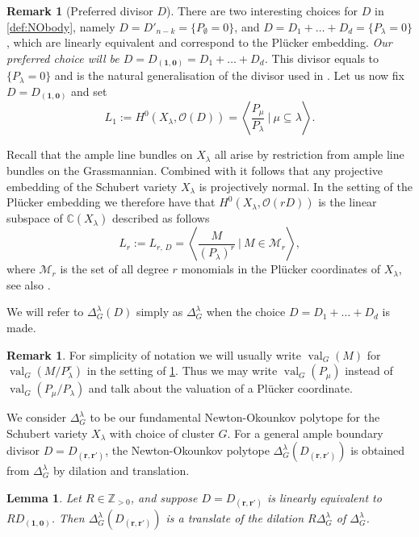 \documentclass{amsart}
\newtheorem{lemma}[thm]{Lemma}
\theoremstyle{definition}
\newtheorem{rem}[thm]{Remark}
\newtheorem{remark}[thm]{Remark}
\numberwithin{equation}{section}
\newcommand{\NO}{\Delta}
\newcommand{\C}{\mathbb{C}}
\newcommand{\Z}{\mathbb{Z}}
\newcommand{\val}{{\operatorname{val}}}
\begin{document}
\begin{rem}[Preferred divisor $D$]\label{rem:special}
There are two interesting choices for $D$ in \cref{def:NObody}, namely $D=D'_{n-k}= \{P_{\emptyset}=0\}$, and  
	$D=D_1+\dotsc +D_{d}= \{P_{\lambda}=0\}$, which are linearly equivalent and correspond to the Pl\"ucker embedding. 
	\emph{Our preferred
	choice will be $D=D_{(\mathbf{1,0})}=D_1+\dotsc +D_{d}$.} This divisor equals to $\{P_\lambda=0\}$ and is the natural generalisation of the divisor used in \cite{RW}. Let us now fix $D=D_{(\mathbf{1,0})}$ and set
	\[
L_1 :=H^0(X_{\lambda}, \mathcal{O}(D)) = \left < \frac{P_{\mu}}{P_{\lambda}} \ \vert \ \mu \subseteq \lambda \right >.
\]

Recall that the ample line bundles on $X_\lambda$ all arise by restriction from ample line bundles on the Grassmannian. Combined with \cite[Theorem 3]{RamananRamanathan} it follows that any projective embedding of the Schubert variety $X_\lambda$ is projectively normal.
	In 
	the setting of the Pl\"ucker embedding we therefore have that
 $H^0(X_{\lambda},\mathcal O(rD))$ 
is the linear subspace of $\C(X_{\lambda})$ described as follows
\begin{equation}\label{e:projnormal}
L_r:=L_{r,\, D}=\left<\frac{M}
{(P_{\lambda})^r} \ \vert \
M\in\mathcal{M}_{r}%
\right>,
\end{equation}
where $\mathcal{M}_r$ is the set of all degree $r$ monomials in the
	Pl\"ucker coordinates of $X_{\lambda}$,
	see also \cite{Lakshmibai}. 
	
We will refer to $\NO^{\lambda}_G(D)$ simply as $\NO^{\lambda}_G$ when  the choice $D=D_1+\dotsc + D_d$ is made.
\end{rem}


\begin{remark}
For simplicity of notation we will usually write $\val_G(M)$ 
for $\val_G(M/P_\lambda^r)$ in the setting of \cref{rem:special}. Thus we may write $\val_G(P_\mu)$ instead of $\val_G(P_\mu/P_\lambda)$ and talk about the valuation of a Pl\"ucker coordinate.	
\end{remark}


We consider $\Delta^\lambda_G$ to be our fundamental Newton-Okounkov polytope for the Schubert variety $X_\lambda$ with choice of cluster $G$. For a general ample boundary divisor $D=D_{(\mathbf{r,r'})}$, the Newton-Okounkov polytope $\Delta_G^\lambda(D_{(\mathbf{r,r'})})$ is obtained from $\Delta^\lambda_G$ by dilation and translation. 

\begin{lemma}\label{l:DeltaShift} Let $R\in\Z_{>0}$, and suppose  $D=D_{(\mathbf{r,r'})}$ is linearly equivalent to $R D_{(\mathbf{1,0})}$.  Then $\Delta_G^\lambda(D_{(\mathbf{r,r'})})$ is a translate of the dilation $R\Delta_G^\lambda$ of $\Delta_G^\lambda$.
\end{lemma}
\end{document}

